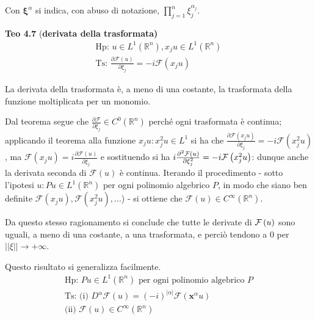 \documentclass{article}
\begin{document}
Con $\mathbf{\xi }^{\alpha }$ si indica, con abuso di notazione, $%
\prod_{j=1}^{n}\xi _{j}^{\alpha _{j}}$.

\textbf{Teo 4.7} (\textbf{derivata della trasformata)}
\begin{gather*}
\text{Hp: }u\in L^{1}\left( 
\mathbb{R}
^{n}\right) ,x_{j}u\in L^{1}\left( 
\mathbb{R}
^{n}\right) \\
\text{Ts: }\frac{\partial \mathcal{F}\left( u\right) }{\partial \xi _{j}}=-i%
\mathcal{F}\left( x_{j}u\right)
\end{gather*}

La derivata della trasformata \`{e}, a meno di una costante, la trasformata
della funzione moltiplicata per un monomio.

Dal teorema segue che $\frac{\partial \mathcal{F}}{\partial \xi _{j}}\in
C^{0}\left( 
\mathbb{R}
^{n}\right) $ perch\'{e} ogni trasformata \`{e} continua; applicando il
teorema alla funzione $x_{j}u:x_{j}^{2}u\in L^{1}$ si ha che $\frac{\partial 
\mathcal{F}\left( x_{j}u\right) }{\partial \xi _{j}}=-i\mathcal{F}\left(
x_{j}^{2}u\right) $, ma $\mathcal{F}\left( x_{j}u\right) =i\frac{\partial 
\mathcal{F}\left( u\right) }{\partial \xi _{j}}$ e sostituendo si ha $i\frac{%
\partial ^{2}\mathcal{F}\left( u\right) }{\partial \xi _{j}^{2}}=-i\mathcal{F%
}\left( x_{j}^{2}u\right) $: dunque anche la derivata seconda di $\mathcal{F}%
\left( u\right) $ \`{e} continua. Iterando il procedimento - sotto l'ipotesi 
$u:Pu\in L^{1}\left( 
\mathbb{R}
^{n}\right) $ per ogni polinomio algebrico $P$, in modo che siano ben
definite $\mathcal{F}\left( x_{j}u\right) ,\mathcal{F}\left(
x_{j}^{2}u\right) ,...$) - si ottiene che $\mathcal{F}\left( u\right) \in
C^{\infty }\left( 
\mathbb{R}
^{n}\right) $.

Da questo stesso ragionamento si conclude che tutte le derivate di $\mathcal{%
F}\left( u\right) $ sono uguali, a meno di una costante, a una trasformata,
e perci\`{o} tendono a $0$ per $\left\vert \left\vert \xi \right\vert
\right\vert \rightarrow +\infty $.

Questo risultato si generalizza facilmente.%
\begin{gather*}
\text{Hp: }Pu\in L^{1}\left( 
\mathbb{R}
^{n}\right) \text{ per ogni polinomio algebrico }P \\
\text{Ts: (i) }D^{\alpha }\mathcal{F}\left( u\right) =\left( -i\right)
^{\left\vert \alpha \right\vert }\mathcal{F}\left( \mathbf{x}^{\alpha
}u\right) \\
\text{(ii) }\mathcal{F}\left( u\right) \in C^{\infty }\left( 
\mathbb{R}
^{n}\right)
\end{gather*}
\end{document}
